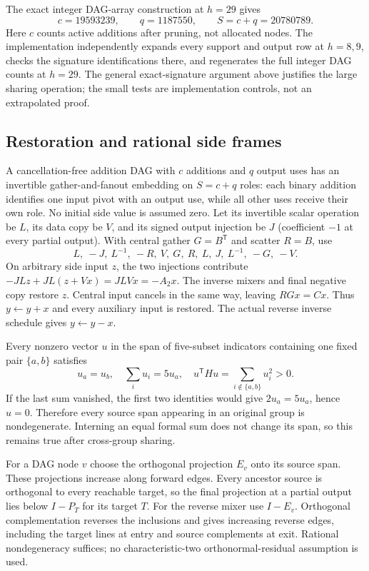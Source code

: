 The exact integer DAG-array construction at $h=29$ gives
\[
 c=19593239,\qquad q=1187550,\qquad S=c+q=20780789.
\]
Here $c$ counts active additions after pruning, not allocated nodes.
The implementation independently expands every support and output row
at $h=8,9$, checks the signature identifications there, and regenerates
the full integer DAG counts at $h=29$. The general exact-signature
argument above justifies the large sharing operation; the small tests
are implementation controls, not an extrapolated proof.

\subsection{Restoration and rational side frames}
A cancellation-free addition DAG with $c$ additions and $q$ output uses
has an invertible gather-and-fanout embedding on $S=c+q$ roles: each
binary addition identifies one input pivot with an output use, while
all other uses receive their own role. No initial side value is assumed
zero. Let its invertible scalar operation be $L$, its data copy be $V$,
and its signed output injection be $J$ (coefficient $-1$ at every partial
output). With central gather $G=B^{\mathsf T}$ and scatter $R=B$, use
\[
 L,\ -J,\ L^{-1},\ -R,\ V,\ G,\ R,\ L,\ J,\ L^{-1},\ -G,\ -V.
\]
On arbitrary side input $z$, the two injections contribute
$-JLz+JL(z+Vx)=JLVx=-A_2x$. The inverse mixers and final negative copy
restore $z$. Central input cancels in the same way, leaving $RGx=Cx$.
Thus $y\gets y+x$ and every auxiliary input is restored. The actual
reverse inverse schedule gives $y\gets y-x$.

Every nonzero vector $u$ in the span of five-subset indicators containing
one fixed pair $\{a,b\}$ satisfies
\[
 u_a=u_b,\quad \sum_i u_i=5u_a,\quad
 u^{\mathsf T}Hu=\sum_{i\notin\{a,b\}}u_i^2>0.
\]
If the last sum vanished, the first two identities would give
$2u_a=5u_a$, hence $u=0$. Therefore every source span appearing in an
original group is nondegenerate. Interning an equal formal sum does not
change its span, so this remains true after cross-group sharing.

For a DAG node $v$ choose the orthogonal projection $E_v$ onto its source
span. These projections increase along forward edges. Every ancestor
source is orthogonal to every reachable target, so the final projection
at a partial output lies below $I-P_T$ for its target $T$. For the
reverse mixer use $I-E_v$. Orthogonal complementation reverses the
inclusions and gives increasing reverse edges, including the target
lines at entry and source complements at exit. Rational nondegeneracy
suffices; no characteristic-two orthonormal-residual assumption is used.

